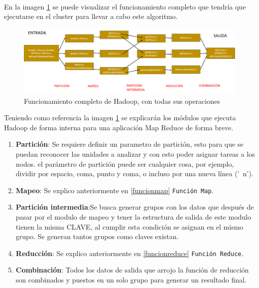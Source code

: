 \\
En la imagen \ref{fig:redi2} se puede visualizar el funcionamiento completo que tendría que ejecutarse en el cluster para llevar a cabo este algoritmo.
\begin{figure}[!htbp]
	\hypertarget{fig:redi2}{\hspace{1pt}}
	\begin{center}
		\includegraphics[width=.9\textwidth]{capitulo4/images/im2.png}
		\caption{Funcionamiento completo de Hadoop, con todas sus operaciones}
		\label{fig:redi2}
	\end{center}
\end{figure}
Teniendo como referencia la imagen \ref{fig:redi2} se explicarán los módulos que ejecuta Hadoop de forma interna para una aplicación Map Reduce de forma breve.
\begin{enumerate}
	\item \textbf{Partición}: Se requiere definir un parametro de partición, esto para que se puedan reconocer las unidades a analizar y con esto poder asignar tareas a los nodos. el parámetro de partición puede ser cualquier cosa, por ejemplo, dividir por espacio, coma, punto y coma, o incluso por una nueva línea ('\ n').
	\item \textbf{Mapeo}: Se explico anteriormente en \ref{funcionmap} \texttt{Función Map}.
	\item \textbf{Partición intermedia}:Se busca generar grupos con los datos que después de pasar por el modulo de mapeo y tener la estructura de salida de este modulo tienen la misma CLAVE, al cumplir esta condición se asignan en el mismo grupo. Se generan tantos grupos como claves existan.
	\item \textbf{Reducción}: Se explico anteriormente en \ref{funcionreduce} \texttt{Función Reduce}. 
	\item \textbf{Combinación}: Todos los datos de salida que arrojo la función de reducción son combinados y puestos en un solo grupo para generar un resultado final.
\end{enumerate}

